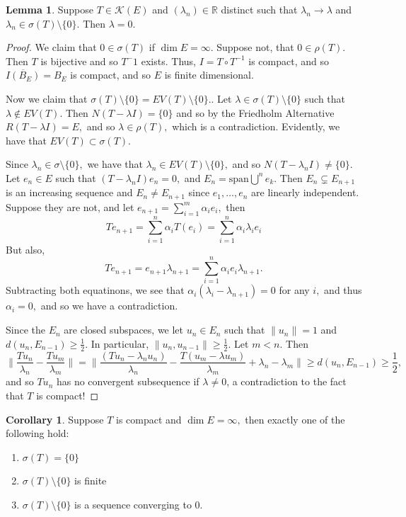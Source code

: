 \documentclass[10pt, oneside]{article}
\newcommand{\bbR}{\mathbb{R}}
\theoremstyle{definition}
\newtheorem{lem}{Lemma}
\newtheorem{cor}{Corollary}
\begin{document}
\begin{lem}
    Suppose $T \in \mathcal{K}(E)$ and $(\lambda_n)\in \bbR$ distinct such  that $\lambda_n \to \lambda$ and $\lambda_n \in \sigma(T)\setminus\{0\}.$ Then $\lambda = 0.$
\end{lem}
\begin{proof}
    We claim that $0\in \sigma(T)$ if $\dim E = \infty.$ Suppose not, that $0\in \rho(T).$ Then $T$ is bijective and so $T^-1$ exists. Thus, $I = T\circ T^{-1}$ is compact, and so $\overline{I(B_E)} = B_E$ is compact, and so $E$ is finite dimensional. 

    Now we claim that $\sigma(T)\setminus \{0\} = EV(T)\setminus \{0\}.$. Let $\lambda \in \sigma(T)\setminus\{0\}$ such that $\lambda \notin EV(T).$ Then $N(T - \lambda I) = \{0\}$ and so by the Friedholm Alternative $R(T - \lambda I) = E,$ and so $\lambda \in \rho(T),$ which is a contradiction. Evidently, we have that $EV(T)\subset \sigma(T).$ 

    Since $\lambda_n \in \sigma\setminus\{0\},$ we have that $\lambda_n \in EV(T)\setminus\{0\},$ and so $N(T - \lambda_n I) \neq \{0\}.$ Let $e_n \in E$ such that $(T - \lambda_n I)e_n = 0,$ and $E_n = \text{span}\bigcup^n e_k.$ Then $E_n \subsetneq E_{n+1}$ is an increasing sequence and $E_n \neq E_{n+1}$ since $e_1, \dots, e_n$ are linearly independent. Suppose they are not, and let $e_{n+1} = \sum_{i=1}^m\alpha_i e_i,$ then 
    \[Te_{n+1} = \sum_{i=1}^n\alpha_i T(e_i) = \sum_{i=1}^n \alpha_i\lambda_i e_i\] But also, 
    \[Te_{n+1} = e_{n+1}\lambda_{n+1}= \sum_{i=1}^n \alpha_i e_i \lambda_{n+1}.\] Subtracting both equatinons, we see that $\alpha_i(\lambda_i - \lambda_{n+1}) = 0$ for any $i,$ and thus $\alpha_i = 0,$ and so we have a contradiction.

    Since the $E_n$ are closed subspaces, we let $u_n \in E_n$ such that $\|u_n\| = 1$ and $d(u_n, E_{n-1})\geq \frac{1}{2}.$ In particular, $\|u_n, u_{n-1}\|\geq \frac{1}{2}.$ Let $m< n.$ Then 
    \[\|\frac{Tu_n}{\lambda_n} - \frac{Tu_m}{\lambda_m}\| = \|\frac{(Tu_n - \lambda_n u_n)}{\lambda_n} - \frac{T(u_m - \lambda u_m)}{\lambda_m} + \lambda_n - \lambda_m\| \geq d(u_n, E_{n-1})\geq \frac{1}{2},\] and so $Tu_n$ has no convergent subsequence if $\lambda \neq 0$, a contradiction to the fact that $T$ is compact!
\end{proof}
\begin{cor}
    Suppose $T$ is compact and $\dim E = \infty,$ then exactly one of the following hold:
    \begin{enumerate}
        \item $\sigma(T)  = \{0\}$
        \item $\sigma(T)\setminus\{0\}$ is finite
        \item $\sigma(T)\setminus \{0\}$ is a sequence converging to $0.$
    \end{enumerate}
\end{cor}
\end{document}
